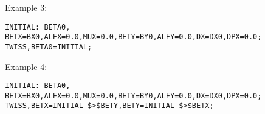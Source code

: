 Example 3: 
\begin{verbatim}
INITIAL: BETA0, BETX=BX0,ALFX=0.0,MUX=0.0,BETY=BY0,ALFY=0.0,DX=DX0,DPX=0.0;
TWISS,BETA0=INITIAL;
\end{verbatim}

Example 4: 
\begin{verbatim}
INITIAL: BETA0, BETX=BX0,ALFX=0.0,MUX=0.0,BETY=BY0,ALFY=0.0,DX=DX0,DPX=0.0;
TWISS,BETX=INITIAL-$>$BETY,BETY=INITIAL-$>$BETX;
\end{verbatim}



